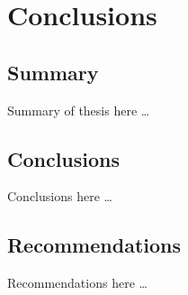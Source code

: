 \chapter{Conclusions}


\section{Summary}
Summary of thesis here \dots

   
\section{Conclusions}
Conclusions here \dots


\section{Recommendations}
Recommendations here \dots

